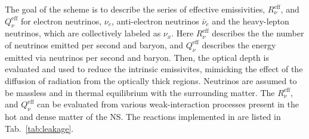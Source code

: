 
%
The goal of the scheme is to describe the series of effective emissivities, 
$R_{\nu}^{\text{eff}}$, and $Q_{\nu}^{\text{eff}}$ for electron neutrinos, $\nu_e$, 
anti-electron neutrinos $\bar{\nu}_e$ and the heavy-lepton neutrinos, 
which are collectively labeled as $\nu_x$.
Here $R_{\nu}^{\text{eff}}$ describes the the number of neutrinos emitted per second and baryon,
and $Q_{\nu}^{\text{eff}}$ describes the energy emitted via neutrinos per second and baryon.
%
Then, the optical depth is evaluated and used to reduce the intrinsic emissivites, 
mimicking the effect of the diffusion of radiation from the optically thick regions.
%
%
Neutrinos are assumed to be massless and in thermal equilibrium with the surrounding matter.
%
%
The $R_{\nu}^{\text{eff}}$, and $Q_{\nu}^{\text{eff}}$ can be evaluated from various 
weak-interaction processes present in the hot and dense matter of the NS. 
%
The reactions implemented in \wisky{} are listed in Tab.~\ref{tab:leakage}.
%

